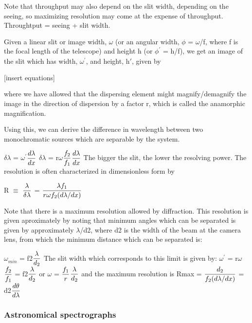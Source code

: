 \documentclass[12pt]{article}
\begin{document}
Note that throughput may also depend on the slit width, depending on
the seeing, so maximizing resolution may come at the expense of
throughput. Throughtput = seeing + slit width.

Given a linear slit or image width, $ \omega$ (or an angular width,  $
\phi$ = $ \omega$/f, where f is the focal length of the telescope) and
height h (or  $ \phi^{\prime}_{}$ = h/f), we get an image of the slit
which has width,  $ \omega^{\prime}_{}$, and height, h$\scriptstyle
\prime$, given by

[insert equations]

where we have allowed that the dispersing element might
magnify/demagnify the image in the direction of dispersion by a factor
r, which is called the anamorphic magnification.

Using this, we can derive the difference in wavelength between two
monochromatic sources which are separable by the system.

$\displaystyle \delta$$\displaystyle \lambda$ = $\displaystyle
\omega^{\prime}_{}$$\displaystyle {d\lambda\over dx}$
$\displaystyle \delta$$\displaystyle \lambda$ = r$\displaystyle
\omega$$\displaystyle {f_2\over f_1}$$\displaystyle {d\lambda\over
dx}$
The bigger the slit, the lower the resolving power.
The resolution is often characterized in dimensionless form by

R $\displaystyle \equiv$ $\displaystyle {\lambda\over \delta\lambda}$
= $\displaystyle {\lambda f_1 \over r \omega f_2 (d\lambda/dx)}$

Note that there is a maximum resolution allowed by diffraction. This
resolution is given aproximately by noting that minimum angles which
can be separated is given by approximately  $ \lambda$/d2, where d2 is
the width of the beam at the camera lens, from which the minimum
distance which can be separated is:

$\displaystyle \omega_{{min}}^{}$ = f2$\displaystyle {\lambda\over
d_2}$
The slit width which corresponds to this limit is given by:
$\displaystyle \omega^{\prime}_{}$ = r$\displaystyle
\omega$$\displaystyle {f_2\over f_1}$ = f2$\displaystyle {\lambda\over
d_2}$
or
$\displaystyle \omega$ = $\displaystyle {f_1 \over r}$$\displaystyle
{\lambda\over d_2}$
and the maximum resolution is
Rmax = $\displaystyle {d_2 \over f_2 (d\lambda/dx)}$ =
d2$\displaystyle {d\theta\over d\lambda}$

\subsubsection*{Astronomical spectrographs}
\end{document}
